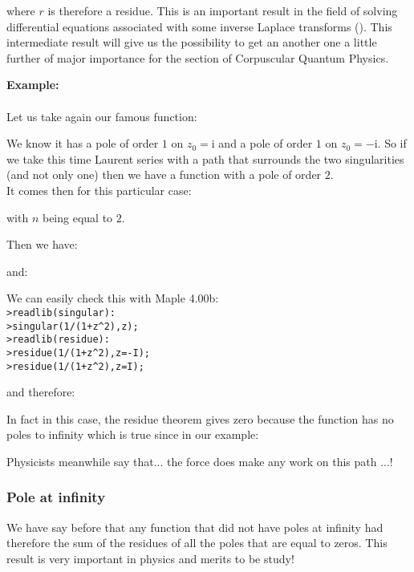 	where $r$ is therefore a residue. This is an important result in the field of solving differential equations associated with some inverse Laplace transforms (). This intermediate result will give us the possibility to get an another one a little further of major importance for the section of Corpuscular Quantum Physics.
	\begin{tcolorbox}[colframe=black,colback=white,sharp corners,breakable]
	\textbf{{\Large {}}Example:}\\\\
	Let us take again our famous function:
	
	We know it has a pole of order $1$ on $z_0=\mathrm{i}$ and a pole of order $1$ on $z_0=-\mathrm{i}$. So if we take this time Laurent series with a path that surrounds the two singularities (and not only one) then we have a function with a pole of order $2$.\\
	
	It comes then for this particular case:
	
	with $n$ being equal to $2$.
	
	Then we have:
	
	and:
	
	We can easily check this with Maple 4.00b:\\
	
	\texttt{>readlib(singular):\\
	>singular(1/(1+z\string^2),z);\\
	>readlib(residue):\\
	>residue(1/(1+z\string^2),z=-I);\\
	>residue(1/(1+z\string^2),z=I);\\}

	and therefore:
	
	In fact in this case, the residue theorem gives zero because the function has no poles to infinity which is true since in our example:
	
	Physicists meanwhile say that... the force does make any work on this path ...!
	\end{tcolorbox}
	
	\subsubsection{Pole at infinity}
	We have say before that any function that did not have poles at infinity had therefore the sum of the residues of all the poles that are equal to zeros. This result is very important in physics and merits to be study!
	
